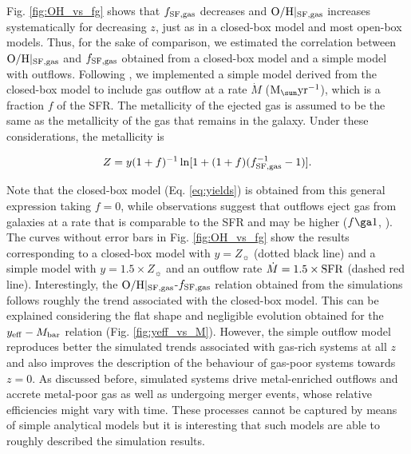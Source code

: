 \documentclass[useAMS,usenatbib]{mn2e}
\begin{document}
Fig. \ref{fig:OH_vs_fg} shows that $f_{\rm SF,gas}$ decreases
and ${\rm O/H}|_{\rm SF,gas}$ increases systematically for decreasing $z$, just as in a closed-box model
and most open-box models.
Thus, for the sake of comparison,
we estimated the correlation between ${\rm O/H}|_{\rm SF,gas}$ and
$f_{\rm SF,gas}$ obtained from a closed-box model and a simple model with outflows.
Following \citet{erb2006}, we implemented a simple model derived from
the closed-box model to include gas outflow at a rate 
$\dot{M}$ (${\rm M}_{\sun} {\rm yr^{-1}}$), which is a fraction $f$ of the SFR.
The metallicity of the ejected gas is assumed to be the same as the metallicity of the gas 
that remains in the galaxy.  Under these considerations, the metallicity is

\begin{equation}
\label{eq:outflow_model}
Z = y (1+f)^{-1} \ln[1+(1+f)(f_{\rm SF,gas}^{-1}-1)].
\end{equation}

Note that the closed-box model (Eq. \ref{eq:yields}) is obtained from this general
expression taking $f=0$, while observations suggest that outflows 
eject gas from galaxies at a rate that is comparable to the SFR 
and may be higher ($f\ga 1$, \citealt{veilleux2005}).
The curves without error bars in Fig. \ref{fig:OH_vs_fg} show the results corresponding to 
a closed-box model with $y= Z_{\sun}$ (dotted black line) and a simple model with $y= 1.5\times Z_{\sun}$
and an outflow rate $\dot{M} = 1.5 \times {\rm SFR}$ (dashed red line).  
Interestingly, the ${\rm O/H}|_{\rm SF,gas}$-$f_{\rm SF,gas}$ relation
obtained from the simulations follows roughly the trend associated with the closed-box model.
This can be explained considering the flat shape and negligible evolution obtained 
for the $y_{\rm eff} - M_{\rm bar}$ relation (Fig. \ref{fig:yeff_vs_M}).  
However, the simple outflow model reproduces better the simulated trends associated with
gas-rich systems at all $z$ and also improves the description of the behaviour of gas-poor systems towards $z=0$.
As discussed before, simulated systems drive metal-enriched
outflows and accrete metal-poor gas as well as undergoing merger events, whose relative efficiencies might vary with time.  
These processes cannot be captured by means of simple analytical models but it is interesting that such
models are able to roughly described the simulation results.
\end{document}

